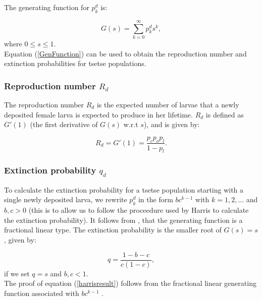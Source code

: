 The generating function for  $p_{k}^{d}$ is:

\begin{equation}
\label{GenFunction}
 G(s) = \sum_{k=0}^{\infty} p_{k}^{d}s^{k},  
\end{equation}
where $ 0\leq s \leq 1.$ \\

Equation (\ref{GenFunction}) can be used to obtain the reproduction number and extinction probabilities for tsetse populations. 

\subsubsection{Reproduction number $R_{d}$}

The reproduction number $R_{d}$ is the expected number of larvae that a newly deposited female larva is expected to produce in her lifetime. $R_{d}$ is defined as $G'(1)$ (the first derivative of $G(s)$ w.r.t $s$), and is given by:

\begin{equation}
\label{larvareproductiveNum}
R_{d} = G'(1) = \frac{p_{c}p_{o}p_{l}}{1-p_{l}}.
\end{equation}  



\subsubsection{Extinction probability  $q_{d}$}

To calculate the extinction probability for a tsetse population starting with a single newly deposited larva, we rewrite $p_{k}^{d}$ in the form $bc^{k-1}$ with $k =1,2,...$ and $b,c > 0$ (this is to allow us to follow the proceedure used by Harris \cite{Harris1965} to calculate the extinction probability). It follows from  \cite{Harris1965}, that the generating function is a fractional linear type. The extinction probability is the smaller root of $G(s)=s$, given by: 

\begin{equation}
\label{harrisresult}
q = \frac{1 - b -c}{c(1-c)},
\end{equation}
if we set $q = s$ and  $b, c < 1$.\\

The proof of equation (\ref{harrisresult}) follows from the fractional linear generating function associated with $bc^{k-1}$ \cite{Harris1965}. \\

